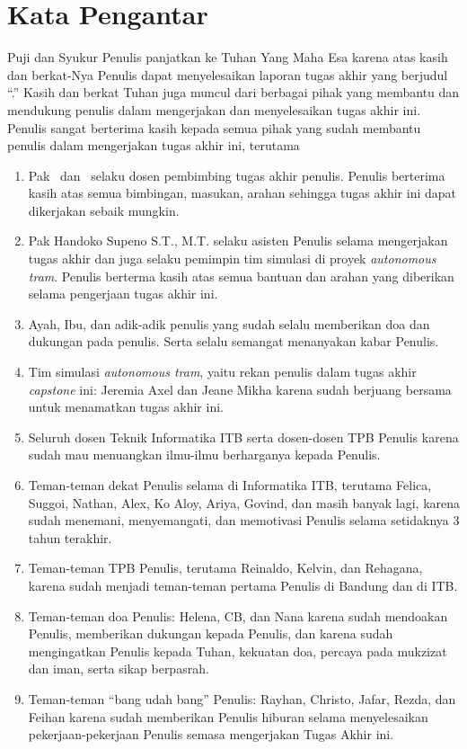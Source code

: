 \chapter*{Kata Pengantar}

Puji dan Syukur Penulis panjatkan ke Tuhan Yang Maha Esa karena atas kasih dan
berkat-Nya Penulis dapat menyelesaikan laporan tugas akhir yang berjudul
``\thetitle.'' Kasih dan berkat Tuhan juga muncul dari berbagai pihak yang
membantu dan mendukung penulis dalam mengerjakan dan menyelesaikan tugas akhir
ini. Penulis sangat berterima kasih kepada semua pihak yang sudah membantu
penulis dalam mengerjakan tugas akhir ini, terutama
\begin{enumerate}
	\item Pak \pembimbingSatu\ dan \pembimbingDua\ selaku dosen pembimbing tugas
	      akhir penulis. Penulis berterima kasih atas semua bimbingan, masukan,
	      arahan sehingga tugas akhir ini dapat dikerjakan sebaik mungkin.
	\item Pak Handoko Supeno S.T., M.T. selaku asisten Penulis selama
	      mengerjakan tugas akhir dan juga selaku pemimpin tim simulasi di
	      proyek \textit{autonomous tram}. Penulis berterma kasih atas semua
	      bantuan dan arahan yang diberikan selama pengerjaan tugas akhir ini.
	\item Ayah, Ibu, dan adik-adik penulis yang sudah selalu memberikan doa dan
	      dukungan pada penulis. Serta selalu semangat menanyakan kabar Penulis.
	\item Tim simulasi \textit{autonomous tram}, yaitu rekan penulis dalam tugas
	      akhir \textit{capstone} ini: Jeremia Axel dan Jeane Mikha karena sudah
	      berjuang bersama untuk menamatkan tugas akhir ini.
	\item Seluruh dosen Teknik Informatika ITB serta dosen-dosen TPB Penulis
	      karena sudah mau menuangkan ilmu-ilmu berharganya kepada Penulis.
	\item Teman-teman dekat Penulis selama di Informatika ITB, terutama Felica,
	      Suggoi, Nathan, Alex, Ko Aloy, Ariya, Govind, dan masih banyak lagi,
	      karena sudah menemani, menyemangati, dan memotivasi Penulis selama
	      setidaknya 3 tahun terakhir.
	\item Teman-teman TPB Penulis, terutama Reinaldo, Kelvin, dan Rehagana,
	      karena sudah menjadi teman-teman pertama Penulis di Bandung dan di
	      ITB.
	\item Teman-teman doa Penulis: Helena, CB, dan Nana karena sudah mendoakan
	      Penulis, memberikan dukungan kepada Penulis, dan karena sudah
	      mengingatkan Penulis kepada Tuhan, kekuatan doa, percaya pada mukzizat
	      dan iman, serta sikap berpasrah.
	\item Teman-teman ``bang udah bang'' Penulis: Rayhan, Christo, Jafar, Rezda,
	      dan Feihan karena sudah memberikan Penulis hiburan selama
	      menyelesaikan pe\-ker\-ja\-an-pekerjaan Penulis semasa mengerjakan Tugas
	      Akhir ini.
\end{enumerate}
